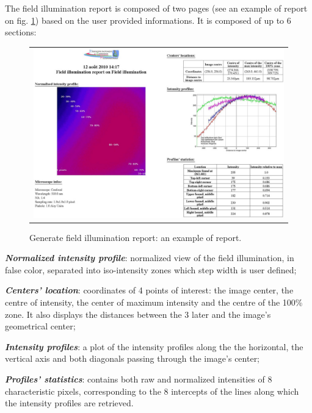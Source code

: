 \documentclass[]{spie}
\begin{document}
The field illumination report is composed of two pages (see an example of report on fig. \ref{fig:gfir-report}) based on the user provided informations. It is composed of up to 6 sections:
\begin{figure}[h]
		\begin{center}
		\begin{tabular}{c}
			\includegraphics[width=0.9\linewidth]{img/gfir-report}
		\end{tabular}
	\end{center}
	\caption{\label{fig:gfir-report}Generate field illumination report: an example of report.}
\end{figure} 
\begin{itemize*}
	\item \textbf{\textit{Normalized intensity profile}}: normalized view of the field illumination, in false color, separated into iso-intensity zones which step width is user defined;
	\item \textbf{\textit{Centers' location}}: coordinates of 4 points of interest: the image center, the centre of intensity, the center of maximum intensity and the centre of the 100\% zone. It also displays the distances between the 3 later and the image's geometrical center;
	\item \textbf{\textit{Intensity profiles}}: a plot of the intensity profiles along the the horizontal, the vertical axis and both diagonals passing through the image's center;
	\item \textbf{\textit{Profiles' statistics}}: contains both raw and normalized intensities of 8 characteristic pixels, corresponding to the 8 intercepts of the lines along which the intensity profiles are retrieved.
\end{itemize*}
\end{document}
